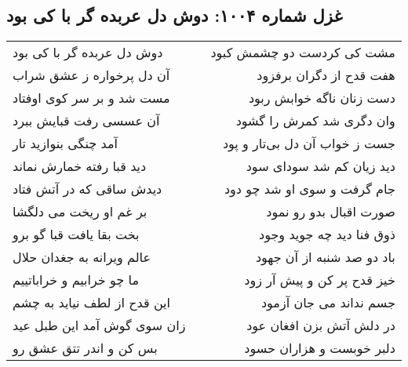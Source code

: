 \begin{center}
\section*{غزل شماره ۱۰۰۴: دوش دل عربده گر با کی بود}
\label{sec:1004}
\begin{longtable}{l p{0.5cm} r}
دوش دل عربده گر با کی بود
&&
مشت کی کردست دو چشمش کبود
\\
آن دل پرخواره ز عشق شراب
&&
هفت قدح از دگران برفزود
\\
مست شد و بر سر کوی اوفتاد
&&
دست زنان ناگه خوابش ربود
\\
آن عسسی رفت قبایش ببرد
&&
وان دگری شد کمرش را گشود
\\
آمد چنگی بنوازید تار
&&
جست ز خواب آن دل بی‌تار و پود
\\
دید قبا رفته خمارش نماند
&&
دید زیان کم شد سودای سود
\\
دیدش ساقی که در آتش فتاد
&&
جام گرفت و سوی او شد چو دود
\\
بر غم او ریخت می دلگشا
&&
صورت اقبال بدو رو نمود
\\
بخت بقا یافت قبا گو برو
&&
ذوق فنا دید چه جوید وجود
\\
عالم ویرانه به جغدان حلال
&&
باد دو صد شنبه از آن جهود
\\
ما چو خرابیم و خراباتییم
&&
خیز قدح پر کن و پیش آر زود
\\
این قدح از لطف نیاید به چشم
&&
جسم نداند می جان آزمود
\\
زان سوی گوش آمد این طبل عید
&&
در دلش آتش بزن افغان عود
\\
بس کن و اندر تتق عشق رو
&&
دلبر خوبست و هزاران حسود
\\
\end{longtable}
\end{center}
